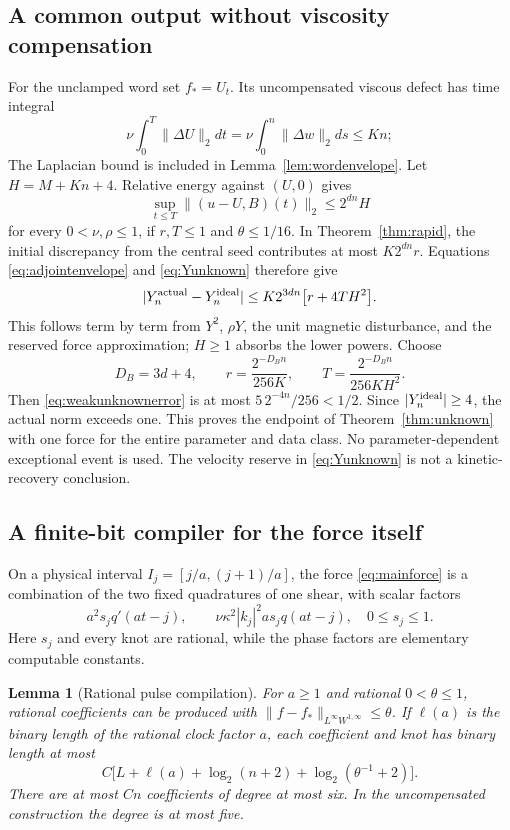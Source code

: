 \documentclass[11pt,a4paper]{amsart}
\newtheorem{lemma}[theorem]{Lemma}
\theoremstyle{definition}
\theoremstyle{remark}
\numberwithin{equation}{section}
\newcommand{\norm}[1]{\lVert #1\rVert}
\begin{document}
\subsection{A common output without viscosity compensation}
For the unclamped word set $f_*=U_t$. Its uncompensated viscous defect has time integral
\[
 \nu\int_0^T\norm{\Delta U}_2dt
 =\nu\int_0^n\norm{\Delta w}_2ds\le Kn;
\]
The Laplacian bound is included in Lemma~\ref{lem:wordenvelope}. Let $H=M+Kn+4$. Relative energy against $(U,0)$ gives
\begin{equation}\label{eq:Yunknown}
 \sup_{t\le T}\norm{(u-U,B)(t)}_2\le2^{dn}H
\end{equation}
for every $0<\nu,\rho\le1$, if $r,T\le1$ and $\theta\le1/16$. In Theorem~\ref{thm:rapid}, the initial discrepancy from the central seed contributes at most $K2^{dn}r$. Equations \eqref{eq:adjointenvelope} and \eqref{eq:Yunknown} therefore give
\begin{equation}\label{eq:weakunknownerror}
 |Y_n^{\rm actual}-Y_n^{\rm ideal}|
 \le K2^{3dn}\big[r+4TH^2\big].
\end{equation}
This follows term by term from $Y^2$, $\rho Y$, the unit magnetic disturbance, and the reserved force approximation; $H\ge1$ absorbs the lower powers. Choose
\begin{equation}\label{eq:clockB}
 D_B=3d+4,\qquad
 r=\frac{2^{-D_Bn}}{256K},\qquad
 T=\frac{2^{-D_Bn}}{256KH^2}.
\end{equation}
Then \eqref{eq:weakunknownerror} is at most $5\,2^{-4n}/256<1/2$. Since $|Y_n^{\rm ideal}|\ge4$, the actual norm exceeds one. This proves the endpoint of Theorem~\ref{thm:unknown} with one force for the entire parameter and data class. No parameter-dependent exceptional event is used. The velocity reserve in \eqref{eq:Yunknown} is not a kinetic-recovery conclusion.

\subsection{A finite-bit compiler for the force itself}
On a physical interval $I_j=[j/a,(j+1)/a]$, the force \eqref{eq:mainforce} is a combination of the two fixed quadratures of one shear, with scalar factors
\[
 a^2 s_j q'(at-j),\qquad
 \nu\kappa^2|k_j|^2a s_j q(at-j),
 \quad 0\le s_j\le1.
\]
Here $s_j$ and every knot are rational, while the phase factors are elementary computable constants.

\begin{lemma}[Rational pulse compilation]\label{lem:pulsebits}
For $a\ge1$ and rational $0<\theta\le1$, rational coefficients can be produced with
$\norm{f-f_*}_{L^\infty W^{1,\infty}}\le\theta$.
If $\ell(a)$ is the binary length of the rational clock factor $a$, each coefficient and knot has binary length at most
\begin{equation}\label{eq:pulsebitheight}
 C\big[L+\ell(a)+\log_2(n+2)+\log_2(\theta^{-1}+2)\big].
\end{equation}
There are at most $Cn$ coefficients of degree at most six. In the uncompensated construction the degree is at most five.
\end{lemma}
\end{document}
